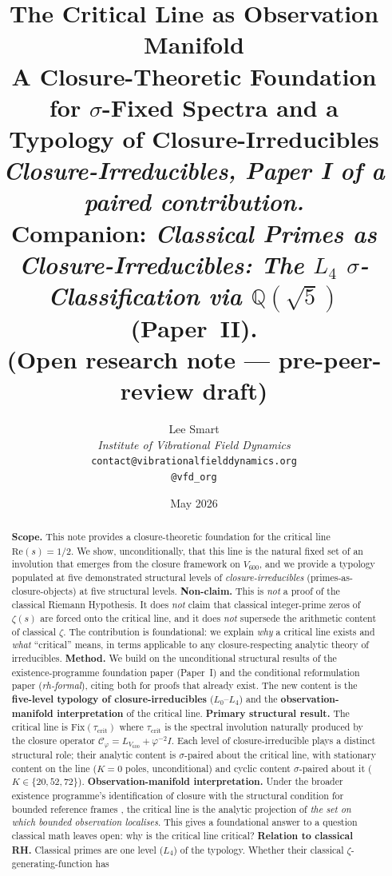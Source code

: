 \documentclass[11pt,a4paper]{article}
\title{\textbf{The Critical Line as Observation Manifold}\\[2pt]
\large A Closure-Theoretic Foundation for $\sigma$-Fixed Spectra and a Typology of Closure-Irreducibles\\[2pt]
\normalsize \emph{Closure-Irreducibles, Paper I of a paired contribution.}\\[1pt]
\small Companion: \emph{Classical Primes as Closure-Irreducibles: The $L_4$ $\sigma$-Classification via $\mathbb{Q}(\sqrt{5})$} (Paper~II).\\[1pt]
\small (Open research note --- pre-peer-review draft)}
\author{%
  Lee Smart\\[4pt]
  \textit{Institute of Vibrational Field Dynamics}\\[2pt]
  \texttt{contact@vibrationalfielddynamics.org}\\[2pt]
  \texttt{@vfd\_org}%
}
\date{May 2026}
\theoremstyle{definition}
\theoremstyle{remark}
\begin{document}
\maketitle
\thispagestyle{empty}

\begin{abstract}
\noindent
\textbf{Scope.} This note provides a closure-theoretic foundation for the
critical line $\mathrm{Re}(s) = 1/2$. We show, unconditionally, that this
line is the natural fixed set of an involution that emerges from the
closure framework on $V_{600}$, and we provide a typology populated at five
demonstrated structural levels of
\emph{closure-irreducibles} (primes-as-closure-objects) at five
structural levels. \textbf{Non-claim.} This is \emph{not} a proof of the
classical Riemann Hypothesis. It does \emph{not} claim that classical
integer-prime zeros of $\zeta(s)$ are forced onto the critical line, and
it does \emph{not} supersede the arithmetic content of classical $\zeta$.
The contribution is foundational: we explain \emph{why} a critical line
exists and \emph{what} ``critical'' means, in terms applicable to any
closure-respecting analytic theory of irreducibles. \textbf{Method.} We
build on the unconditional structural results of the existence-programme
foundation paper (Paper~I) and the conditional reformulation paper
(\emph{rh-formal}), citing both for proofs that already exist. The new
content is the \textbf{five-level typology of closure-irreducibles}
($L_0$--$L_4$) and the \textbf{observation-manifold interpretation} of
the critical line. \textbf{Primary structural result.} The critical line
is $\mathrm{Fix}(\tau_{\mathrm{crit}})$ where $\tau_{\mathrm{crit}}$ is
the spectral involution naturally produced by the closure operator
$\mathcal{C}_\varphi = L_{V_{600}} + \varphi^{-2} I$. Each level of
closure-irreducible plays a distinct structural role; their analytic
content is $\sigma$-paired about the critical line, with stationary
content on the line ($K=0$ poles, unconditional) and cyclic content
$\sigma$-paired about it ($K \in \{20, 52, 72\}$).
\textbf{Observation-manifold interpretation.} Under the broader
existence programme's identification of closure with the structural
condition for bounded reference frames \cite{SmartExistenceClosure}, the
critical line is the analytic projection of \emph{the set on which
bounded observation localises}. This gives a foundational answer to a
question classical math leaves open: why is the critical line critical?
\textbf{Relation to classical RH.} Classical primes are one level ($L_4$)
of the typology. Whether their classical $\zeta$-generating-function has

\end{abstract}
\end{document}
